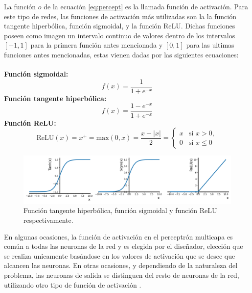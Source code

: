 \documentclass[12pt,letterpaper,oneside,openright]{book}
\begin{document}
	La función $o$ de la ecuación \ref{eq:percept} es la llamada función de activación. Para este tipo de redes, las funciones de activación más utilizadas son la la función tangente hiperbólica, función sigmoidal, y la función ReLU. Dichas funciones poseen como imagen un intervalo continuo de valores dentro de los intervalos $[-1,1]$ para la primera función antes mencionada y $[0,1]$ para las ultimas funciones antes mencionadas, estas vienen dadas por las siguientes ecuaciones: \\ \\
	\textbf{Función sigmoidal:}
	\begin{equation}
		\label{eq:tangente_hiper}
		f(x) = \frac{1}{1 + e^{-x}}
	\end{equation}
	\textbf{Función tangente hiperbólica:}
	\begin{equation}
		\label{eq:sigmoidal}
		f(x) = \frac{1-e^{-x}}{1 + e^{-x}}
	\end{equation}
	\textbf{Función ReLU:}
	\begin{equation}
		\label{eq:ReLU}
		\mathrm{ReLU}(x) = x^{+} = \mathrm{max}(0,x) = \frac{x + |x|}{2} = \left\{\begin{array}{lll}
			x & \text{si } x > 0, \\
			0 & \text{si } x \leq 0
		\end{array}\right.
	\end{equation}
	
		\begin{figure}[h]
		\centering
		\includegraphics[width=0.9\linewidth]{Sem_1/figuras/funciones_de_activacion}
		\caption{Función tangente hiperbólica, función sigmoidal y función ReLU respectivamente.}
		\label{fig:funciones_activacion}
	\end{figure}
	
	En algunas ocasiones, la función de activación en el perceptrón multicapa es común a todas las neuronas de la red y es elegida por el diseñador, elección que se realiza unicamente basándose en los valores de activación que se desee que alcancen las neuronas. En otras ocasiones, y dependiendo de la naturaleza del problema, las neuronas de salida se distinguen del resto de neuronas de la red, utilizando otro tipo de función de activación \cite{percepMulti}.
	
\end{document}
